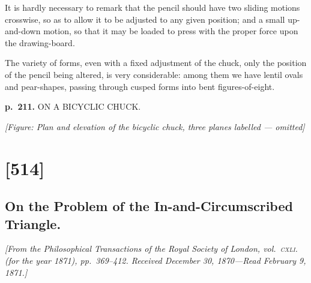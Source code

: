 \documentclass[11pt,a4paper]{article}
\begin{document}
It is hardly necessary to remark that the pencil should have two sliding motions
crosswise, so as to allow it to be adjusted to any given position; and a small
up-and-down motion, so that it may be loaded to press with the proper force upon
the drawing-board.

The variety of forms, even with a fixed adjustment of the chuck, only the position
of the pencil being altered, is very considerable: among them we have lentil ovals and
pear-shapes, passing through cusped forms into bent figures-of-eight.

\clearpage

\noindent
\textbf{p.~211.}  ON A BICYCLIC CHUCK.

\begin{center}
\textit{[Figure: Plan and elevation of the bicyclic chuck, three planes labelled --- omitted]}
\end{center}

\clearpage

\section{[514]}
\subsection{On the Problem of the In-and-Circumscribed Triangle.}

\begin{center}
\textit{[From the Philosophical Transactions of the Royal Society of London, vol.\ \textsc{cxli.} (for the
year 1871), pp.\ 369--412.  Received December 30, 1870---Read February 9, 1871.]}
\end{center}
\end{document}
